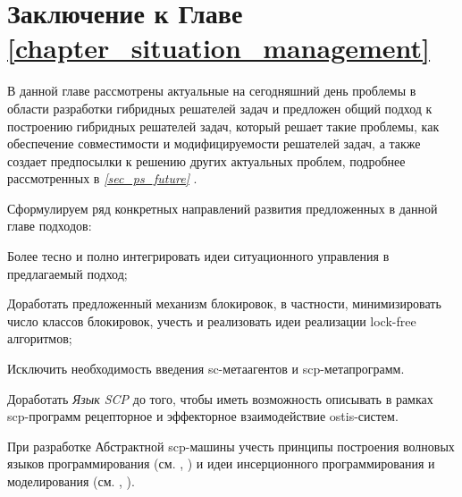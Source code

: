 \section*{Заключение к Главе \ref{chapter_situation_management}}

В данной главе рассмотрены актуальные на сегодняшний день проблемы в области разработки гибридных решателей задач и предложен общий подход к построению гибридных решателей задач, который решает такие проблемы, как обеспечение совместимости и модифицируемости решателей задач, а также создает предпосылки к решению других актуальных проблем, подробнее рассмотренных в \textit{\ref{sec_ps_future} }.

Сформулируем ряд конкретных направлений развития предложенных в данной главе подходов:

\begin{textitemize}
	\item Более тесно и полно интегрировать идеи ситуационного управления в предлагаемый подход;
	\item Доработать предложенный механизм блокировок, в частности, минимизировать число классов блокировок, учесть и реализовать идеи реализации lock-free алгоритмов;
	\item Исключить необходимость введения sc-метаагентов и scp-метапрограмм.
	\item Доработать \textit{Язык SCP} до того, чтобы иметь возможность описывать в рамках scp-программ рецепторное и эффекторное взаимодействие ostis-систем.
	\item При разработке Абстрактной scp-машины учесть принципы построения волновых языков программирования (см. , ) и идеи инсерционного программирования и моделирования (см. , ).
\end{textitemize}

%